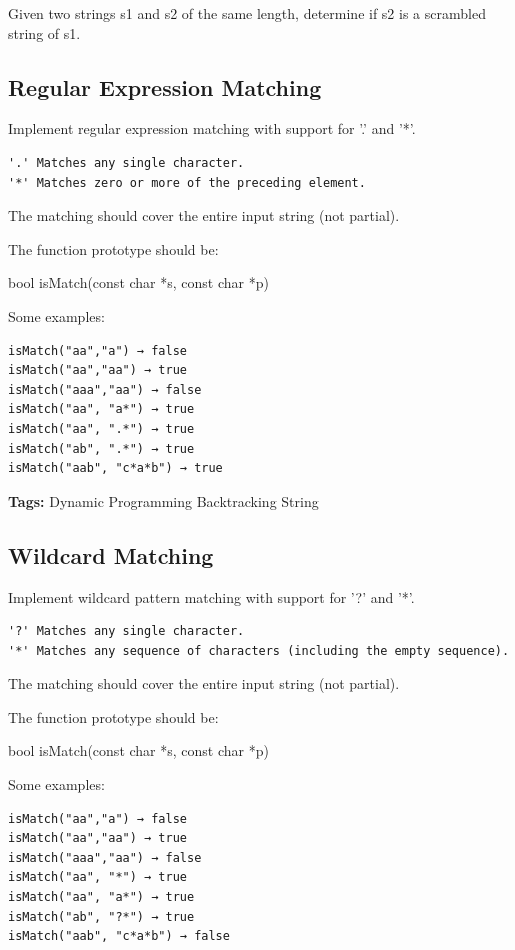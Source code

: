\documentclass[12pt]{book}
\begin{document}
Given two strings s1 and s2 of the same length, determine if s2 is a scrambled string of s1.

\subsection{Regular Expression Matching}
\label{sec-14-3-8}
Implement regular expression matching with support for '.' and '*'.
\lstset{language=java,label= ,caption= ,numbers=none}
\begin{lstlisting}
'.' Matches any single character.
'*' Matches zero or more of the preceding element.
\end{lstlisting}

The matching should cover the entire input string (not partial).

The function prototype should be:

bool isMatch(const char *s, const char *p)

Some examples:
\lstset{language=java,label= ,caption= ,numbers=none}
\begin{lstlisting}
isMatch("aa","a") → false
isMatch("aa","aa") → true
isMatch("aaa","aa") → false
isMatch("aa", "a*") → true
isMatch("aa", ".*") → true
isMatch("ab", ".*") → true
isMatch("aab", "c*a*b") → true
\end{lstlisting}

\textbf{Tags:} Dynamic Programming Backtracking String

\subsection{Wildcard Matching}
\label{sec-14-3-9}
Implement wildcard pattern matching with support for '?' and '*'.
\lstset{language=java,label= ,caption= ,numbers=none}
\begin{lstlisting}
'?' Matches any single character.
'*' Matches any sequence of characters (including the empty sequence).
\end{lstlisting}

The matching should cover the entire input string (not partial).

The function prototype should be:

bool isMatch(const char *s, const char *p)

Some examples:
\lstset{language=java,label= ,caption= ,numbers=none}
\begin{lstlisting}
isMatch("aa","a") → false
isMatch("aa","aa") → true
isMatch("aaa","aa") → false
isMatch("aa", "*") → true
isMatch("aa", "a*") → true
isMatch("ab", "?*") → true
isMatch("aab", "c*a*b") → false
\end{lstlisting}
\end{document}
